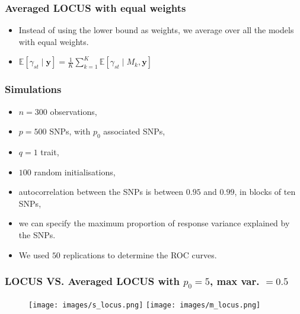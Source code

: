\documentclass{beamer}
\newcommand*\mean[1]{\bar{#1}}
\begin{document}
\begin{frame}
\frametitle{Averaged LOCUS with equal weights}
\begin{itemize}
\item Instead of using the lower bound as weights, we average over all the models with equal weights.
\item $\mathbb{E}\left[\gamma_{st}\mid \boldsymbol{y}\right]=\frac{1}{K} \sum_{k=1}^K \mathbb{E}\left[\gamma_{st}\mid M_k,\boldsymbol{y}\right]$
\end{itemize}
\end{frame}


\begin{frame}
\frametitle{Simulations}
\begin{itemize}
\item $n = 300$ observations,
\item $p = 500$ SNPs, with $p_0$ associated SNPs,
\item $q = 1$ trait, %
\item $100$ random initialisations,
\item autocorrelation between the SNPs is between $0.95$ and $0.99$, in blocks of ten SNPs,
\item we can specify the maximum proportion of response variance explained by the SNPs.
\item We used $50$ replications to determine the ROC curves.
\end{itemize}
\end{frame}

\begin{frame}
\frametitle{LOCUS VS. Averaged LOCUS with $p_0 = 5$, max var. $=0.5$}
\begin{figure}
\texttt{[image: images/s\_locus.png]}
\texttt{[image: images/m\_locus.png]}
\end{figure}
\end{frame}
\end{document}
